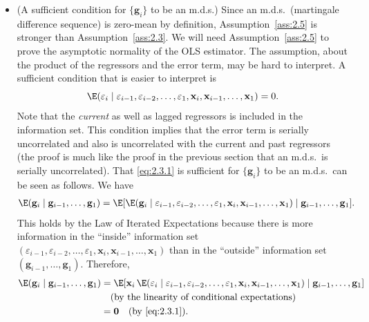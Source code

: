 \begin{itemize}
\item (A sufficient condition for $\{\mathbf{g}_i\}$ to be an m.d.s.)\quad
  Since an m.d.s.\ (martingale difference sequence) is zero-mean by definition,
  Assumption~\ref{ass:2.5} is stronger than Assumption~\ref{ass:2.3}.  We will need
  Assumption~\ref{ass:2.5} to prove the asymptotic normality of the OLS estimator.
  The assumption, about the product of the regressors and the error term, may be hard
  to interpret.  A sufficient condition that is easier to interpret is
  \begin{equation}
    \E(\varepsilon_i \mid \varepsilon_{i-1}, \varepsilon_{i-2}, \ldots,
    \varepsilon_1, \mathbf{x}_i, \mathbf{x}_{i-1}, \ldots, \mathbf{x}_1) = 0.
    \label{eq:2.3.1}
  \end{equation}
  Note that the \emph{current} as well as lagged regressors is included in the
  information set.  This condition implies that the error term is serially uncorrelated
  and also is uncorrelated with the current and past regressors (the proof is much
  like the proof in the previous section that an m.d.s.\ is serially uncorrelated).
  That \eqref{eq:2.3.1} is sufficient for $\{\mathbf{g}_i\}$ to be an m.d.s.\ can be
  seen as follows.  We have
  \begin{align}
    \E(\mathbf{g}_i \mid \mathbf{g}_{i-1}, \ldots, \mathbf{g}_1)
    &= \E[\E(\mathbf{g}_i \mid \varepsilon_{i-1}, \varepsilon_{i-2}, \ldots,
       \varepsilon_1, \mathbf{x}_i, \mathbf{x}_{i-1}, \ldots, \mathbf{x}_1)
       \mid \mathbf{g}_{i-1}, \ldots, \mathbf{g}_1].
       \notag
  \end{align}
  This holds by the Law of Iterated Expectations because there is more information
  in the ``inside'' information set
  $(\varepsilon_{i-1}, \varepsilon_{i-2}, \ldots, \varepsilon_1, \mathbf{x}_i,
  \mathbf{x}_{i-1}, \ldots, \mathbf{x}_1)$ than in the ``outside'' information set
  $(\mathbf{g}_{i-1}, \ldots, \mathbf{g}_1)$.  Therefore,
  \begin{align}
    \E(\mathbf{g}_i \mid \mathbf{g}_{i-1}, \ldots, \mathbf{g}_1)
    &= \E[\mathbf{x}_i\,\E(\varepsilon_i \mid \varepsilon_{i-1},
       \varepsilon_{i-2}, \ldots, \varepsilon_1, \mathbf{x}_i,
       \mathbf{x}_{i-1}, \ldots, \mathbf{x}_1)
       \mid \mathbf{g}_{i-1}, \ldots, \mathbf{g}_1] \notag \\
    &\quad \text{(by the linearity of conditional expectations)} \notag \\
    &= \mathbf{0} \quad (\text{by } \eqref{eq:2.3.1}).
    \label{eq:2.3.2}
  \end{align}


\end{itemize}
